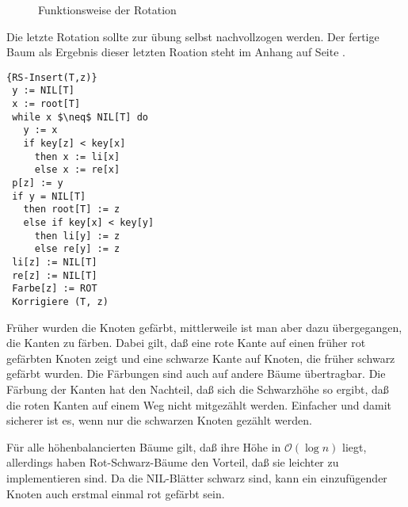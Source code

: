 \documentclass[ngerman,draft,parskip=half*,twoside]{scrreprt}
\theoremstyle{break}
\theoremstyle{nonumberbreak}
\newcommand*{\OO}{\mathcal{O}}      %
\begin{document}
\begin{figure}[H]
\centering
\hspace{5mm}

\caption{Funktionsweise der Rotation}
\end{figure}
Die letzte Rotation sollte zur übung selbst nachvollzogen werden. Der fertige Baum als Ergebnis dieser letzten Roation steht im Anhang
auf Seite \pageref{sec:rsrotation}.

\begin{Algorithmus}[H]
\begin{lstlisting}[frame=tlrb, mathescape=true, title=\textsc{RS-Insert\textnormal{(T, z)}}, gobble=1]{RS-Insert(T,z)}
 y := NIL[T]
 x := root[T]
 while x $\neq$ NIL[T] do
   y := x
   if key[z] < key[x]
     then x := li[x]
     else x := re[x]
 p[z] := y
 if y = NIL[T]
   then root[T] := z
   else if key[x] < key[y]
     then li[y] := z
     else re[y] := z
 li[z] := NIL[T]
 re[z] := NIL[T]
 Farbe[z] := ROT
 Korrigiere (T, z)
\end{lstlisting}
\end{Algorithmus}

Früher wurden die Knoten gefärbt, mittlerweile ist man aber dazu übergegangen, die Kanten zu färben. Dabei gilt, daß eine rote
Kante auf einen früher rot gefärbten Knoten zeigt und eine schwarze Kante auf Knoten, die früher schwarz gefärbt
wurden. Die Färbungen sind auch auf andere Bäume übertragbar. Die Färbung der Kanten hat den Nachteil, daß sich die Schwarzhöhe so
ergibt, daß die roten Kanten auf einem Weg nicht mitgezählt werden. Einfacher und damit sicherer ist es, wenn nur die schwarzen Knoten
gezählt werden.

Für alle höhenbalancierten Bäume gilt, daß ihre Höhe in $\OO(\log n)$ liegt, allerdings haben Rot-Schwarz-Bäume den Vorteil, daß
sie leichter zu implementieren sind. Da die NIL-Blätter schwarz sind, kann ein einzufügender Knoten auch erstmal einmal rot gefärbt
sein.
\end{document}
